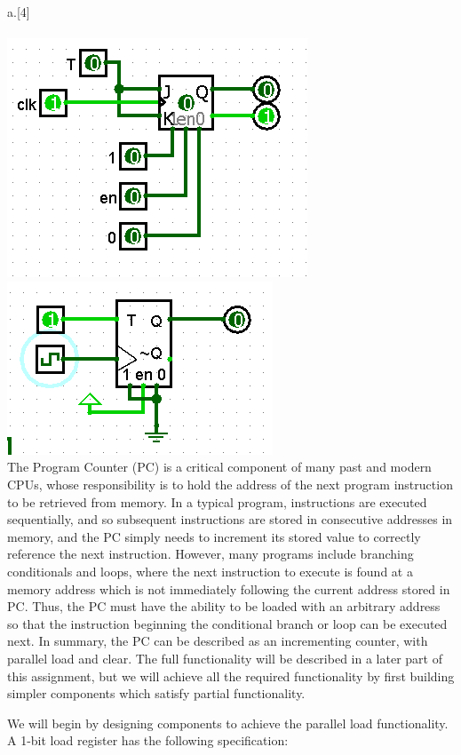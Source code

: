 \begin{question}{a.}[4]
\\
\\\includegraphics{q6-1-1.PNG}
\\\includegraphics{q6-1-2.PNG}
\\
The Program Counter (PC) is a critical component of many past and modern CPUs, whose responsibility is to hold the address of the next program instruction to be retrieved from memory. In a typical program, instructions are executed sequentially, and so subsequent instructions are stored in consecutive addresses in memory, and the PC simply needs to increment its stored value to correctly reference the next instruction. However, many programs include branching conditionals and loops, where the next instruction to execute is found at a memory address which is not immediately following the current address stored in PC. Thus, the PC must have the ability to be loaded with an arbitrary address so that the instruction beginning the conditional branch or loop can be executed next. In summary, the PC can be described as an incrementing counter, with parallel load and clear. The full functionality will be described in a later part of this assignment, but we will achieve all the required functionality by first building simpler components which satisfy partial functionality.

We will begin by designing components to achieve the parallel load functionality. A 1-bit load register has the following specification:


\end{question}
